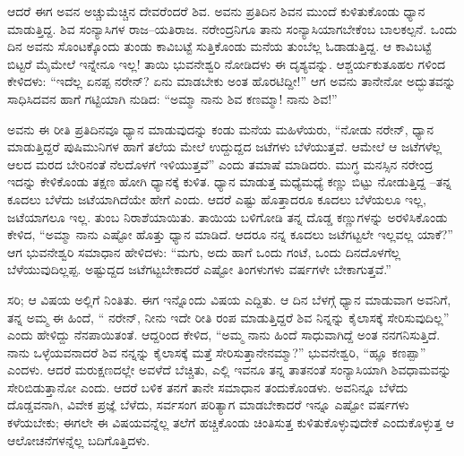 ಆದರೆ ಈಗ ಅವನ ಅಚ್ಚುಮೆಚ್ಚಿನ ದೇವರೆಂದರೆ ಶಿವ. ಅವನು ಪ್ರತಿದಿನ ಶಿವನ ಮುಂದೆ ಕುಳಿತುಕೊಂಡು ಧ್ಯಾನ ಮಾಡುತ್ತಿದ್ದ. ಶಿವ ಸಂನ್ಯಾಸಿಗಳ ರಾಜ–ಯತಿರಾಜ. ನರೇಂದ್ರನಿಗೂ ತಾನು ಸಂನ್ಯಾಸಿಯಾಗಬೇಕೆಂಬ ಬಾಲಕಲ್ಪನೆ. ಒಂದು ದಿನ ಅವನು ಸೊಂಟಕ್ಕೊಂದು ತುಂಡು ಕಾವಿಬಟ್ಟೆ ಸುತ್ತಿಕೊಂಡು ಮನೆಯ ತುಂಬೆಲ್ಲ ಓಡಾಡುತ್ತಿದ್ದ. ಆ ಕಾವಿಬಟ್ಟೆ ಬಿಟ್ಟರೆ ಮೈಮೇಲೆ ಇನ್ನೇನೂ ಇಲ್ಲ! ತಾಯಿ ಭುವನೇಶ್ವರಿ ನೋಡಿದಳು ಈ ದೃಶ್ಯವನ್ನು. ಆಶ್ಚರ್ಯಕುತೂಹಲ ಗಳಿಂದ ಕೇಳಿದಳು: “ಇದೆಲ್ಲ ಏನಪ್ಪ ನರೇನ್? ಏನು ಮಾಡಬೇಕು ಅಂತ ಹೊರಟಿದ್ದೀ!” ಆಗ ಅವನು ತಾನೇನೋ ಅದ್ಭುತವನ್ನು ಸಾಧಿಸಿದವನ ಹಾಗೆ ಗಟ್ಟಿಯಾಗಿ ನುಡಿದ: “ಅಮ್ಮಾ ನಾನು ಶಿವ ಕಣಮ್ಮಾ! ನಾನು ಶಿವ!”

ಅವನು ಈ ರೀತಿ ಪ್ರತಿದಿನವೂ ಧ್ಯಾನ ಮಾಡುವುದನ್ನು ಕಂಡು ಮನೆಯ ಮಹಿಳೆಯರು, “ನೋಡು ನರೇನ್, ಧ್ಯಾನ ಮಾಡುತ್ತಿದ್ದರೆ ಪುಷಿಮುನಿಗಳ ಹಾಗೆ ತಲೆಯ ಮೇಲೆ ಉದ್ದುದ್ದದ ಜಟೆಗಳು ಬೆಳೆಯುತ್ತವೆ. ಆಮೇಲೆ ಆ ಜಟೆಗಳೆಲ್ಲ ಆಲದ ಮರದ ಬೇರಿನಂತೆ ನೆಲದೊಳಗೆ ಇಳಿಯುತ್ತವೆ” ಎಂದು ತಮಾಷೆ ಮಾಡಿದರು. ಮುಗ್ಧ ಮನಸ್ಸಿನ ನರೇಂದ್ರ ಇದನ್ನು ಕೇಳಿಕೊಂಡು ತಕ್ಷಣ ಹೋಗಿ ಧ್ಯಾನಕ್ಕೆ ಕುಳಿತ. ಧ್ಯಾನ ಮಾಡುತ್ತ ಮಧ್ಯೆಮಧ್ಯೆ ಕಣ್ಣು ಬಿಟ್ಟು ನೋಡುತ್ತಿದ್ದ –ತನ್ನ ಕೂದಲು ಬೆಳೆದು ಜಟೆಯಾಗಿದೆಯೇ ಹೇಗೆ ಎಂದು. ಆದರೆ ಎಷ್ಟು ಹೊತ್ತಾದರೂ ಕೂದಲು ಬೆಳೆಯಲೂ ಇಲ್ಲ, ಜಟೆಯಾಗಲೂ ಇಲ್ಲ. ತುಂಬ ನಿರಾಶೆಯಾಯಿತು. ತಾಯಿಯ ಬಳಿಗೋಡಿ ತನ್ನ ದೊಡ್ಡ ಕಣ್ಣುಗಳನ್ನು ಅರಳಿಸಿಕೊಂಡು ಕೇಳಿದ, “ಅಮ್ಮಾ ನಾನು ಎಷ್ಟೋ ಹೊತ್ತು ಧ್ಯಾನ ಮಾಡಿದೆ. ಆದರೂ ನನ್ನ ಕೂದಲು ಜಟೆಗಟ್ಟಲೇ ಇಲ್ಲವಲ್ಲ ಯಾಕೆ?” ಆಗ ಭುವನೇಶ್ವರಿ ಸಮಾಧಾನ ಹೇಳಿದಳು: “ಮಗು, ಅದು ಹಾಗೆ ಒಂದು ಗಂಟೆ, ಒಂದು ದಿನದೊಳಗೆಲ್ಲ ಬೆಳೆಯುವುದಿಲ್ಲಪ್ಪ. ಅಷ್ಟುದ್ದದ ಜಟೆಗಟ್ಟಬೇಕಾದರೆ ಎಷ್ಟೋ ತಿಂಗಳುಗಳು ವರ್ಷಗಳೇ ಬೇಕಾಗುತ್ತವೆ.”

ಸರಿ; ಆ ವಿಷಯ ಅಲ್ಲಿಗೆ ನಿಂತಿತು. ಈಗ ಇನ್ನೊಂದು ವಿಷಯ ಎದ್ದಿತು. ಆ ದಿನ ಬೆಳಗ್ಗೆ ಧ್ಯಾನ ಮಾಡುವಾಗ ಅವನಿಗೆ, ತನ್ನ ಅಮ್ಮ ಈ ಹಿಂದೆ, “ ನರೇನ್, ನೀನು ಇದೇ ರೀತಿ ರಂಪ ಮಾಡುತ್ತಿದ್ದರೆ ಶಿವ ನಿನ್ನನ್ನು ಕೈಲಾಸಕ್ಕೆ ಸೇರಿಸುವುದಿಲ್ಲ” ಎಂದು ಹೇಳಿದ್ದು ನೆನಪಾಯಿತಂತೆ. ಆದ್ದರಿಂದ ಕೇಳಿದ, “ಅಮ್ಮ ನಾನು ಹಿಂದೆ ಸಾಧುವಾಗಿದ್ದೆ ಅಂತ ನನಗನಿಸುತ್ತಿದೆ. ನಾನು ಒಳ್ಳೆಯವನಾದರೆ ಶಿವ ನನ್ನನ್ನು ಕೈಲಾಸಕ್ಕೆ ಮತ್ತೆ ಸೇರಿಸುತ್ತಾನೇನಮ್ಮಾ?” ಭುವನೇಶ್ವರಿ, “ಹ್ಞೂ ಕಣಪ್ಪಾ” ಎಂದಳು. ಆದರೆ ಮರುಕ್ಷಣದಲ್ಲೇ ಅವಳೆದೆ ಬೆಚ್ಚಿತು, ಎಲ್ಲಿ ಇವನೂ ತನ್ನ ತಾತನಂತೆ ಸಂನ್ಯಾಸಿಯಾಗಿ ಶಿವಧಾಮವನ್ನು ಸೇರಿಬಿಡುತ್ತಾನೋ ಎಂದು. ಆದರೆ ಬಳಿಕ ತನಗೆ ತಾನೇ ಸಮಾಧಾನ ತಂದುಕೊಂಡಳು. ಅವನಿನ್ನೂ ಬೆಳೆದು ದೊಡ್ಡವನಾಗಿ, ವಿವೇಕ ಪ್ರಜ್ಞೆ ಬೆಳೆದು, ಸರ್ವಸಂಗ ಪರಿತ್ಯಾಗ ಮಾಡಬೇಕಾದರೆ ಇನ್ನೂ ಎಷ್ಟೋ ವರ್ಷಗಳು ಕಳೆಯಬೇಕು; ಈಗಲೇ ಈ ವಿಷಯವನ್ನೆಲ್ಲ ತಲೆಗೆ ಹಚ್ಚಿಕೊಂಡು ಚಿಂತಿಸುತ್ತ ಕುಳಿತುಕೊಳ್ಳುವುದೇಕೆ ಎಂದುಕೊಳ್ಳುತ್ತ ಆ ಆಲೋಚನೆಗಳನ್ನೆಲ್ಲ ಬದಿಗೊತ್ತಿದಳು.

